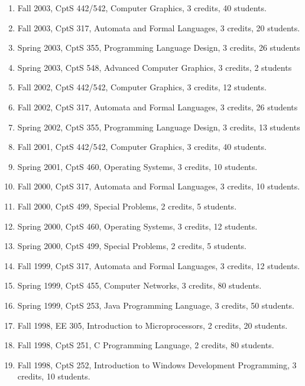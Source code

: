 \documentclass[12pt]{article}
\begin{document}


\begin{enumerate}
\item Fall 2003, CptS 442/542, Computer Graphics, 3 credits, 40 students.
\item Fall 2003, CptS 317, Automata and Formal Languages, 3 credits,
   20 students.
\item Spring 2003, CptS 355, Programming Language Design, 3 credits, 
    26 students
\item Spring 2003, CptS 548, Advanced Computer Graphics, 3 credits, 2 students
\item Fall 2002, CptS 442/542, Computer Graphics, 3 credits, 12 students.
\item Fall 2002, CptS 317, Automata and Formal Languages, 3 credits, 
  26 students
\item Spring 2002, CptS 355, Programming Language Design, 3 credits, 
    13 students
\item Fall 2001, CptS 442/542, Computer Graphics, 3 credits, 40 students.
\item Spring 2001, CptS 460, Operating Systems, 3 credits, 10 students.
\item Fall 2000, CptS 317, Automata and Formal Languages, 3 credits, 
   10 students.
\item Fall 2000, CptS 499, Special Problems, 2 credits, 5 students.
\item Spring 2000, CptS 460, Operating Systems, 3 credits, 12 students.
\item Spring 2000, CptS 499, Special Problems, 2 credits, 5 students.
\item Fall 1999, CptS 317, Automata and Formal Languages, 3 credits, 
   12 students.
\item Spring 1999, CptS 455, Computer Networks, 3 credits,
   80 students.
\item Spring 1999, CptS 253, Java Programming Language, 3 credits, 
   50 students.
\item Fall 1998, EE 305, Introduction to Microprocessors, 2 credits,
   20 students.
\item Fall 1998, CptS 251, C Programming Language, 2 credits, 80 students.
\item Fall 1998, CptS 252, Introduction to Windows Development Programming,
  3 credits, 10 students.
\end{enumerate}
\end{document}
